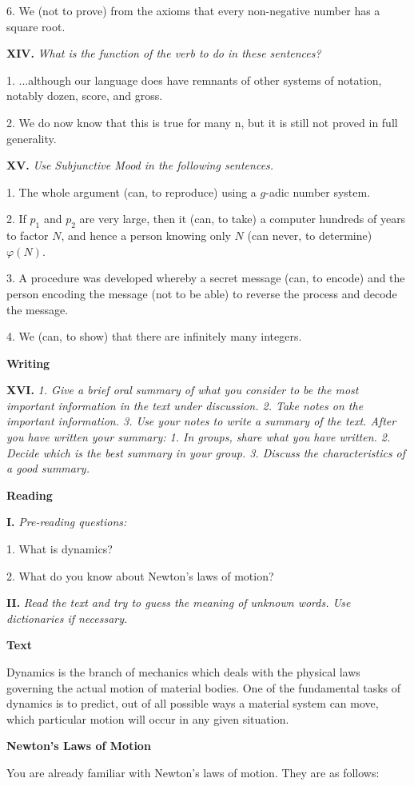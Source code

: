 \documentclass[a4paper]{article}
\newcounter{EUnits}
\newcommand{\EUnit}{\par\medskip{\huge \textbf{Unit \arabic{EUnits}}}\par\stepcounter{EUnits}}
\newcommand{\ESect}[1]{\medskip\par{\large \textbf{#1}}\par}
\newcommand{\ETask}[2]{\medskip\par\textbf{#1.} \textit{#2}\par}
\begin{document}
6. We (not to prove) from the axioms that every non-negative number has a square root.

\ETask{XIV}{What is the function of the verb to do in these sentences?}
1. ...although our language does have remnants of other systems of notation, notably dozen, score, and gross.

2. We do now know that this is true for many n, but it is still not proved in full generality.

\ETask{XV}{Use Subjunctive Mood in the following sentences.}
1. The whole argument (can, to reproduce) using a $g$-adic number system.

2. If $p_1$ and $p_2$ are very large, then it (can, to take) a computer hundreds of years to factor $N$, and hence a person knowing
only $N$ (can never, to determine) $\varphi(N)$.

3. A procedure was developed whereby a secret message (can, to encode) and the person encoding the message (not to be able) to
reverse the process and decode the message.

4. We (can, to show) that there are infinitely many integers.

\ESect{Writing}

\ETask{XVI}{1. Give a brief oral summary of what you consider to be the most important information in the text under discussion.
2. Take notes on the important information. 3. Use your notes to write a summary of the text. After you have written your summary:
1. In groups, share what you have written. 2. Decide which is the best summary in your group. 3. Discuss the characteristics of
a good summary.}

\EUnit
\setcounter{equation}{0}
\ESect{Reading}

\ETask{I}{Pre-reading questions:}

1. What is dynamics?

2. What do you know about Newton's laws of motion?

\ETask{II}{Read the text and try to guess the meaning of unknown words. Use dictionaries if necessary.}

\ESect{Text}
Dynamics is the branch of mechanics which deals with the physical laws governing the actual motion of material bodies. One
of the fundamental tasks of dynamics is to predict, out of all possible ways a material system can move, which particular
motion will occur in any given situation.

\textbf{Newton's Laws of Motion}

You are already familiar with Newton's laws of motion. They are as follows:
\end{document}
